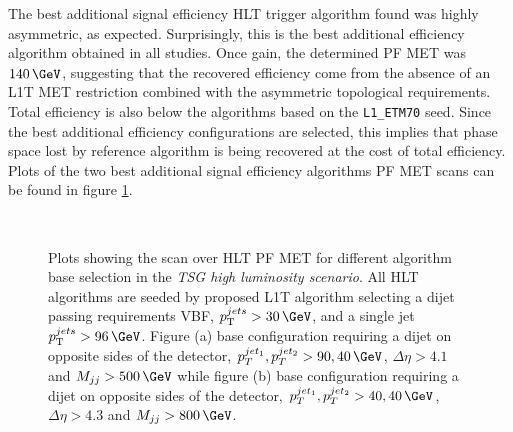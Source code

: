 The best additional signal efficiency \gls{HLT} trigger algorithm found was highly asymmetric, as expected. Surprisingly, this is the best additional efficiency algorithm obtained in all studies. Once gain, the determined \gls{PF} \gls{MET} was $140\,\GeV$, suggesting that the recovered efficiency come from the absence of an \gls{L1T} \gls{MET} restriction combined with the asymmetric topological requirements. Total efficiency is also below the algorithms based on the \verb|L1_ETM70| seed. Since the best additional efficiency configurations are selected, this implies that phase space lost by reference algorithm is being recovered at the cost of total efficiency. Plots of the two best additional signal efficiency algorithms \gls{PF} \gls{MET} scans can be found in figure \ref{FIGURE:RunIITriggerStudies_HLT_Seed_L1TDijetSingleJet}.

\begin{figure}[!htp]%
\centering
{}\qquad
{}\\
\caption{Plots showing the scan over \gls{HLT} \gls{PF} \gls{MET} for different algorithm base selection in the \textit{\gls{TSG} high luminosity scenario}. All \gls{HLT} algorithms are seeded by proposed \gls{L1T} algorithm selecting a dijet passing requirements \gls{VBF}, $\pt^{jets}>30\,\GeV$, and a single jet $\pt^{jets}>96\,\GeV$. Figure (a) base configuration requiring a dijet on opposite sides of the detector, $p_T^{jet_1},p_T^{jet_2}>90,40\,\GeV$, $\Delta\eta>4.1$ and $M_{jj}>500\,\GeV$ while figure (b) base configuration requiring a dijet on opposite sides of the detector, $p_T^{jet_1},p_T^{jet_2}>40,40\,\GeV$, $\Delta\eta>4.3$ and $M_{jj}>800\,\GeV$.}
\label{FIGURE:RunIITriggerStudies_HLT_Seed_L1TDijetSingleJet}
\end{figure}

